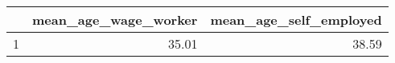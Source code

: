 \begin{table}[ht]
\centering
\begin{tabular}{rrr}
  \hline
 & mean\_age\_wage\_worker & mean\_age\_self\_employed \\ 
  \hline
1 & 35.01 & 38.59 \\ 
   \hline
\end{tabular}
\end{table}
